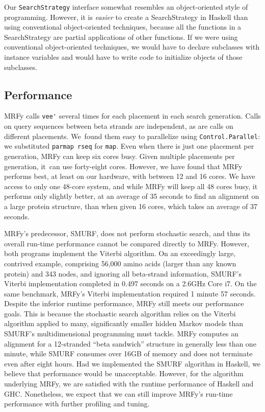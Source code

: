 \documentclass[nonatbib]{sigplanconf}
\newcommand\seclabel[1]{\label{sec:#1}}
\begin{document}
Our \texttt{SearchStrategy} interface somewhat resembles an object-oriented
style of programming.
However, it is \textit{easier} to create a SearchStrategy
in Haskell than using conventional object-oriented techniques, because
all the functions in a SearchStrategy are partial applications of
other functions.
If we were using conventional object-oriented
techniques, we would have to declare subclasses with instance
variables and would have to write code to initialize objects of those
subclasses. 


\subsection{Performance}

\seclabel{perf}

MRFy calls \verb+vee'+ several
 times
for each placement in each search generation.
Calls on query sequences between beta strands are independent,
as are calls on different placements.
We~found them easy to parallelize
using
\texttt{Control.Parallel}:
we substituted
\texttt{parmap rseq} for \texttt{map}.
Even when there is just one placement per generation,
MRFy can keep six cores busy.
Given multiple placements per generation,
it~can use forty-eight cores.
However, we have found that MRFy performs best, at least on our
hardware, with between 12 and 16 cores.
We have access to only
one 48-core system, and while MRFy will keep all 48 cores busy, it
performs only slightly better, at an average of 35 seconds to find an alignment
on a large protein structure, than when given 16 cores, which takes an average
of 37 seconds. 

MRFy's predecessor, SMURF, does not perform stochastic search,
and thus its overall run-time performance cannot be compared directly to MRFy.
However, both programs implement the Viterbi algorithm.
On an exceedingly large, contrived example, comprising 56,000 amino acids
(larger than any known protein) and 343 nodes, and ignoring all beta-strand
information, SMURF's Viterbi implementation completed in 0.497 seconds on a
2.6GHz Core i7.
On the same benchmark, MRFy's Viterbi implementation required 1 minute 57
seconds.
Despite the inferior runtime performance, MRFy still meets our performance
goals.
This is because the stochastic search algorithm relies on the Viterbi algorithm
applied to many, significantly smaller hidden Markov models than SMURF's
multidimensional programming must tackle.
MRFy computes an alignment for a 12-stranded ``beta sandwich'' structure in
generally less than one minute, while SMURF consumes over 16GB of memory
and does not terminate even after eight hours.
Had we implemented the SMURF algorithm in Haskell, we believe that performance
would be unacceptable.
However, for the algorithm underlying MRFy, we are satisfied with the runtime
performance of Haskell and GHC.
Nonetheless, we expect that we can still improve MRFy's run-time performance
with further profiling and tuning.
\end{document}
